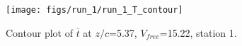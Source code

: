 \begin{figure}[H]
\centering
\texttt{[image: figs/run\_1/run\_1\_T\_contour]}
\caption{Contour plot of $\overline{t}$ at $z/c$=5.37, $V_{free}$=15.22, station 1.}
\label{fig:run_1_T_contour}
\end{figure}


